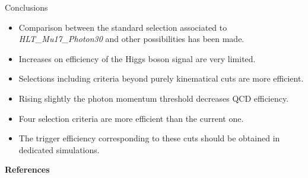 \documentclass[aspectratio = 1610, xcolor = dvipsnames]{beamer}
\newcommand{\red}{\textcolor{unipd}}
\begin{document}
    \begin{frame}[t]{Conclusions}
		\vspace{20pt}
        \begin{itemize}
            \item \red{Comparison} between the standard selection associated to {\it HLT\_Mu17\_Photon30} and other possibilities has been made.\vspace{5pt}
            \item Increases on efficiency of the Higgs boson signal are \red{very limited}.\vspace{5pt}
            \item Selections including \red{criteria beyond purely kinematical} cuts are \red{more efficient}.
            \item Rising slightly the \red{photon momentum threshold} decreases QCD efficiency.\vspace{5pt}
            \item Four selection criteria are \red{more efficient} than the current one.\vspace{5pt}
            \item The \red{trigger efficiency} corresponding to these cuts should be obtained in \red{dedicated simulations}.
        \end{itemize}

    \end{frame}

    
	\begin{frame}{\bf References}
		\footnotesize{\printbibliography}
	\end{frame}
	
	
\end{document}
